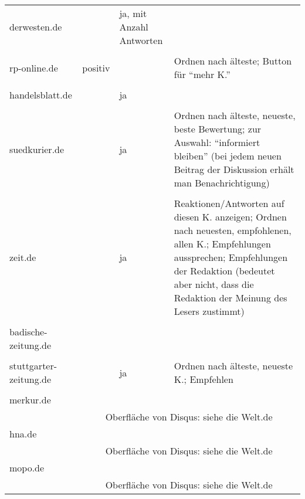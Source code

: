 \begin{landscape}
\begin{longtable}{l|p{40mm}p{40mm}p{80mm}}
  derwesten.de & & ja, mit Anzahl Antworten & \\
               & \multicolumn{3}{c}{}\\\hline

  rp-online.de & positiv & & Ordnen nach älteste; Button für ``mehr K.''\\
            & \multicolumn{3}{c}{}\\\hline

  handelsblatt.de & & ja & \\
               & \multicolumn{3}{c}{}\\\hline

  suedkurier.de & & ja &
    Ordnen nach älteste, neueste, beste Bewertung; zur Auswahl: ``informiert
    bleiben'' (bei jedem neuen Beitrag der Diskussion erhält man
    Benachrichtigung)\\
    & \multicolumn{3}{c}{}\\\hline

  zeit.de & & ja &
    Reaktionen/Antworten auf diesen K. anzeigen; Ordnen nach neuesten,
    empfohlenen, allen K.; Empfehlungen aussprechen; Empfehlungen der Redaktion
    (bedeutet aber nicht, dass die Redaktion der Meinung des Lesers zustimmt)\\
    & \multicolumn{3}{c}{}\\\hline

  badische-zeitung.de & & & \\
                   & \multicolumn{3}{c}{} \\\hline

  stuttgarter-zeitung.de & & ja & Ordnen nach älteste, neueste K.; Empfehlen\\
                      & \multicolumn{3}{c}{}\\\hline

  merkur.de &  & & \\
         & \multicolumn{3}{c}{Oberfläche von Disqus: siehe die Welt.de}\\\hline


  hna.de & & & \\
      & \multicolumn{3}{c}{Oberfläche von Disqus: siehe die Welt.de}\\\hline

  mopo.de & & & \\
         & \multicolumn{3}{c}{Oberfläche von Disqus: siehe die Welt.de}\\\hline


\end{longtable}
\end{landscape}
